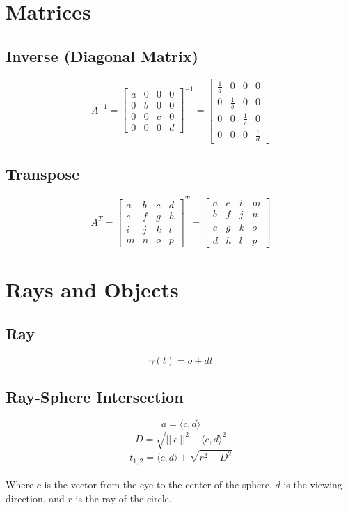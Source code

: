 \documentclass{article}
\begin{document}
\section{Matrices}
\subsection{Inverse (Diagonal Matrix)}
\vspace{.3cm}
\[ A^{-1} = \begin{bmatrix} a & 0 & 0 & 0 \\ 0 & b & 0 & 0 \\ 0 & 0 & c & 0 \\ 0 & 0 & 0 & d \end{bmatrix}^{-1} = \begin{bmatrix} \frac{1}{a} & 0 & 0 & 0 \\ 0 & \frac{1}{b} & 0 & 0 \\ 0 & 0 & \frac{1}{c} & 0 \\ 0 & 0 & 0 & \frac{1}{d} \end{bmatrix} \]

\subsection{Transpose}
\vspace{.3cm}
\[ A^T = \begin{bmatrix} a & b & c & d \\ e & f & g & h \\ i & j & k & l \\ m & n & o & p \end{bmatrix}^T = \begin{bmatrix} a & e & i & m \\ b & f & j & n \\ c & g & k & o \\ d & h & l & p \end{bmatrix} \]

\section{Rays and Objects}
\subsection{Ray}
\vspace{.3cm}
\[ \gamma(t) = o + dt \]

\subsection{Ray-Sphere Intersection}
\vspace{.3cm}
\[ a = \langle c, d \rangle \]
\[ D = \sqrt{||~c~||^2 - \langle c, d \rangle^2} \]
\[ t_{1,2} = \langle c, d \rangle \pm \sqrt{r^2 - D^2} \] \\
Where $c$ is the vector from the eye to the center of the sphere, $d$ is the viewing direction, and $r$ is the ray of the circle.
\end{document}
